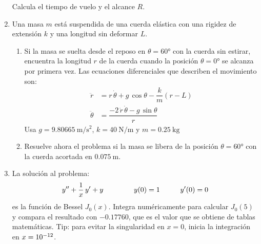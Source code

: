 \begin{enumerate}
Calcula el tiempo de vuelo y el alcance $R$.
\item Una masa $m$ está suspendida de una cuerda elástica con una rigidez de extensión $k$ y una longitud sin deformar $L$. 
\begin{figure}[H]
\centering
{}
\end{figure}
\begin{enumerate}
\item Si la masa se suelta desde el reposo en $\theta = \ang{60}$ con la cuerda sin estirar, encuentra la longitud $r$ de la cuerda cuando la posición $\theta = \ang{0}$ se alcanza por primera vez. Las ecuaciones diferenciales que describen el movimiento son:
\begin{align*}
\ddot{r} &= r \, \dot{\theta} + g \, \cos \theta - \dfrac{k}{m} (r - L) \\[0.5em]
\ddot{\theta} &= \dfrac{-2 \, \dot{r} \, \dot{\theta} - g \, \sin \theta}{r}
\end{align*}
Usa $g = \SI{9.80665}{\meter\per\square\second}$, $k = \SI{40}{\newton\per\metre}$ y $m = \SI{0.25}{\kilo\gram}$
\item Resuelve ahora el problema si la masa se libera de la posición $\theta = \ang{60}$ con la cuerda acortada en $\SI{0.075}{\meter}$.
\end{enumerate}
\item La solución al problema:
\begin{align*}
{y}^{\prime \prime} + \dfrac{1}{x} \, {y}^{\prime} + y \hspace{1.5cm} y (0) = 1 \hspace{1cm} {y}^{\prime}(0) = 0
\end{align*}
es la función de Bessel $J_{0} (x)$. Integra numéricamente para calcular $J_{0} (5)$ y compara el resultado con $-0.17760$, que es el valor que se obtiene de tablas matemáticas. Tip: para evitar la singularidad en $x = 0$, inicia la integración en $x = \num{d-12}$.

\end{enumerate}
